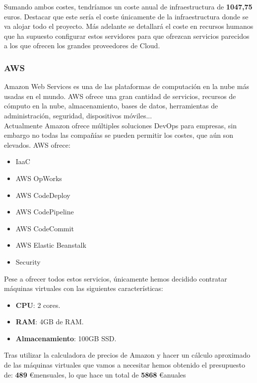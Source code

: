 \begin{text}
			Sumando ambos costes, tendríamos un coste anual de infraestructura de \textbf{1047,75} euros. Destacar que este sería el coste únicamente de la infraestructura donde se va alojar todo el proyecto. Más adelante se detallará el coste en recursos humanos que ha supuesto configurar estos servidores para que ofrezcan servicios parecidos a los que ofrecen los grandes proveedores de Cloud.
			
			\end{text}
		\subsubsection{AWS}
			\begin{text}
				Amazon Web Services es una de las plataformas de computación en la nube más usadas en el mundo. 
				AWS ofrece una gran cantidad de servicios, recursos de cómputo en la nube, almacenamiento, bases de datos, herramientas de administración, seguridad, dispositivos móviles... \\
				Actualmente Amazon ofrece múltiples soluciones DevOps para empresas, sin embargo no todas las compañías se pueden permitir los costes, que aún son elevados. AWS ofrece:
				
				\begin{itemize}
					\item IaaC
					\item AWS OpWorks
					\item AWS CodeDeploy	
					\item AWS CodePipeline
					\item AWS CodeCommit
					\item AWS Elastic Beanstalk
					\item Security
				\end{itemize}
			
			Pese a ofrecer todos estos servicios, únicamente hemos decidido contratar máquinas virtuales con las siguientes características:
			
			\begin{itemize}
				\item \textbf{CPU}: 2 cores.
				\item \textbf{RAM}: 4GB de RAM.
				\item \textbf{Almacenamiento}: 100GB SSD.
			\end{itemize}
			
			Tras utilizar la calculadora de precios de Amazon \cite{amazoncalculadora:online} y hacer un cálculo aproximado de las máquinas virtuales que vamos a necesitar hemos obtenido el presupuesto de: \textbf{489} \euro mensuales, lo que hace un total de \textbf{5868} \euro anuales
				
			\end{text}
		
